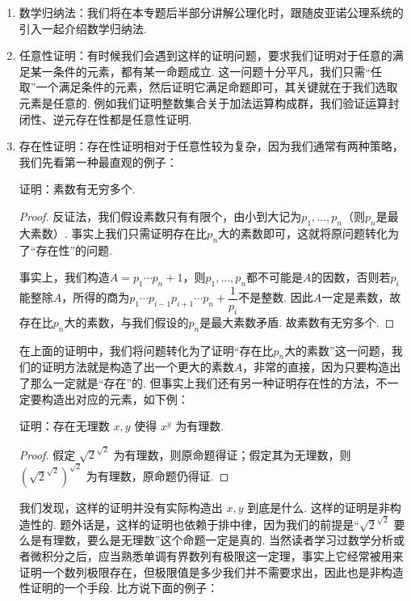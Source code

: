 \begin{enumerate}
    \item 数学归纳法：我们将在本专题后半部分讲解公理化时，跟随皮亚诺公理系统的引入一起介绍数学归纳法.

    \item 任意性证明：有时候我们会遇到这样的证明问题，要求我们证明对于任意的满足某一条件的元素，都有某一命题成立. 这一问题十分平凡，我们只需``任取''一个满足条件的元素，然后证明它满足命题即可，其关键就在于我们选取元素是任意的. 例如我们证明整数集合关于加法运算构成群，我们验证运算封闭性、逆元存在性都是任意性证明.

    \item 存在性证明：存在性证明相对于任意性较为复杂，因为我们通常有两种策略，我们先看第一种最直观的例子：
          \begin{example}
              证明：素数有无穷多个.
          \end{example}
          \begin{proof}
              反证法，我们假设素数只有有限个，由小到大记为$p_1,\ldots,p_n$（则$p_n$是最大素数）. 事实上我们只需证明存在比$p_n$大的素数即可，这就将原问题转化为了``存在性''的问题.

              事实上，我们构造$A=p_1\cdots p_n+1$，则$p_1,\ldots,p_n$都不可能是$A$的因数，否则若$p_i$能整除$A$，所得的商为$p_1\cdots p_{i-1}p_{i+1}\cdots p_n+\dfrac{1}{p_i}$不是整数. 因此$A$一定是素数，故存在比$p_n$大的素数，与我们假设的$p_n$是最大素数矛盾. 故素数有无穷多个.
          \end{proof}

          在上面的证明中，我们将问题转化为了证明``存在比$p_n$大的素数''这一问题，我们的证明方法就是构造了出一个更大的素数$A$，非常的直接，因为只要构造出了那么一定就是``存在''的. 但事实上我们还有另一种证明存在性的方法，不一定要构造出对应的元素，如下例：
          \begin{example*}
              证明：存在无理数 $x, y$ 使得 $x^y$ 为有理数.
          \end{example*}
          \begin{proof}
              假定 $\sqrt{2}^{\sqrt{2}}$ 为有理数，则原命题得证；假定其为无理数，则 $\left(\sqrt{2}^{\sqrt{2}}\right)^{\sqrt{2}}$ 为有理数，原命题仍得证.
          \end{proof}

          我们发现，这样的证明并没有实际构造出 $x, y$ 到底是什么. 这样的证明是非构造性的. 题外话是，这样的证明也依赖于排中律，因为我们的前提是``$\sqrt{2}^{\sqrt{2}}$ 要么是有理数，要么是无理数''这个命题一定是真的. 当然读者学习过数学分析或者微积分之后，应当熟悉单调有界数列有极限这一定理，事实上它经常被用来证明一个数列极限存在，但极限值是多少我们并不需要求出，因此也是非构造性证明的一个手段. 比方说下面的例子：


\end{enumerate}
